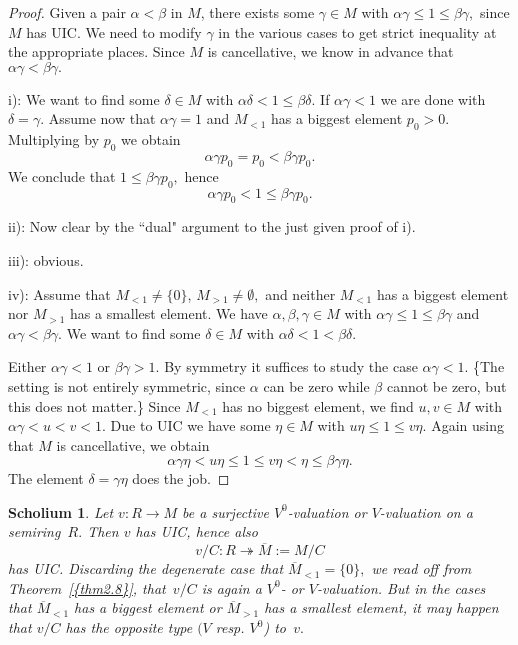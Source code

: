 \documentclass [12pt,a4paper,reqno]{amsart}
\newtheorem{schol}[thm]{Scholium}
\begin{document}
\begin{proof}
Given a pair ${\alpha} <{\beta} $ in $M$, there exists some ${\gamma} \in M$
with ${\alpha} {\gamma} \le 1\le {\beta} {\gamma} ,$ since $M$ has UIC. We need to
modify ${\gamma} $ in the various cases to get strict inequality at the
appropriate places. Since $M$ is cancellative, we know in advance
that ${\alpha} {\gamma} <{\beta} {\gamma} .$

i): We want to find some $\delta\in M$ with ${\alpha} \delta<1\le {\beta}
\delta.$ If ${\alpha} {\gamma} <1$ we are done with $\delta={\gamma} .$ Assume
now that ${\alpha} {\gamma} =1$ and $M_{<1}$ has a biggest element $p_0>0.$
Multiplying by $p_0$ we obtain
$${\alpha} {\gamma}  p_0= p_0<{\beta} {\gamma}  p_0.$$
We conclude that $1\le {\beta} {\gamma}  p_0,$ hence
$${\alpha} {\gamma}  p_0<1\le {\beta} {\gamma}  p_0.$$ {\vskip 1.5mm \noindent}

ii): Now  clear by the ``dual" argument to the just given proof of
i). {\vskip 1.5mm \noindent}

iii): obvious. {\vskip 1.5mm \noindent}

iv): Assume that $M_{<1}\ne\{0\}$, $M_{>1}\ne\emptyset,$ and
neither $M_{<1}$ has a biggest element nor $M_{>1}$ has a smallest
element. We have ${\alpha} ,{\beta} ,{\gamma} \in M$ with ${\alpha} {\gamma} \le 1\le {\beta}
{\gamma} $ and ${\alpha} {\gamma} <{\beta} {\gamma} .$ We want to find some $\delta\in M$
with ${\alpha} \delta<1<{\beta} \delta.$

Either ${\alpha} {\gamma} <1$ or ${\beta} {\gamma} >1.$ By symmetry it suffices to
study the case ${\alpha} {\gamma} <1.$ \{The setting is not entirely
symmetric, since ${\alpha} $ can be zero while ${\beta} $ cannot be zero,
but this does not matter.\} Since $M_{<1}$ has no biggest element,
we find $u,v\in M$ with ${\alpha} {\gamma} <u< v<1.$ Due to UIC we have some
$\eta\in M$ with $u\eta\le 1\le v\eta.$ Again using that $M$ is
cancellative, we obtain
$${\alpha} {\gamma}  \eta< u\eta\le 1\le v\eta<\eta\le
{\beta} {\gamma} \eta.$$ The element $\delta={\gamma} \eta$ does the job.
\end{proof}

\begin{schol}\label{schol2.9}
Let $v: R\to M$ be a surjective $V^0$-valuation or $V$-valuation
on a semiring~$R.$ Then $v$ has UIC, hence also $$v/C:
R\twoheadrightarrow {\overline M}:=M/C$$ has UIC. Discarding the degenerate
case that ${\overline M}_{<1}=\{0\},$ we read off from {Theorem~\ref{{thm2.8}}},
that~$v/C$ is again a $V^0$- or $V$-valuation. But in the cases
that ${\overline M}_{<1}$ has a biggest element or ${\overline M}_{>1}$ has a
smallest element, it may happen that $v/C$ has the opposite type
$(V$ resp. $V^0$) to~$v.$
\end{schol}
\end{document}
